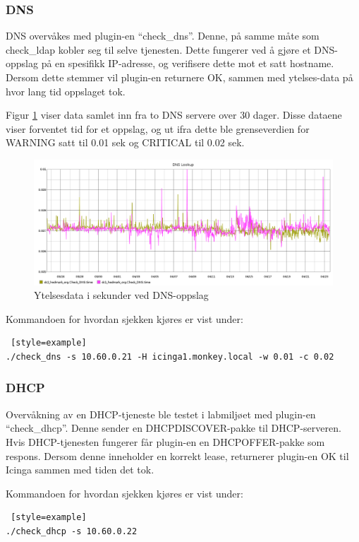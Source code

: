 \subsubsection*{DNS}
DNS overvåkes med plugin-en ``check\_dns''. Denne, på samme måte som check\_ldap kobler seg til selve tjenesten. Dette fungerer ved å gjøre et DNS-oppslag på en spesifikk IP-adresse, og verifisere dette mot et satt hostname. Dersom dette stemmer vil plugin-en returnere OK, sammen med ytelses-data på hvor lang tid oppslaget tok.

Figur \ref{dns-inv} viser data samlet inn fra to DNS servere over 30 dager. Disse dataene viser forventet tid for et oppslag, og ut ifra dette ble grenseverdien for WARNING satt til 0.01 sek og CRITICAL til 0.02 sek.

\begin{figure}[H]
    \centering
    \includegraphics[width=1.0\textwidth]{img/dns-inv}
    \caption{Ytelsesdata i sekunder ved DNS-oppslag}
    \label{dns-inv}
\end{figure}
Kommandoen for hvordan sjekken kjøres er vist under:
\begin{lstlisting} [style=example]
./check_dns -s 10.60.0.21 -H icinga1.monkey.local -w 0.01 -c 0.02
\end{lstlisting}

\clearpage
\subsubsection*{DHCP}
Overvåkning av en DHCP-tjeneste ble testet i labmiljøet med plugin-en ``check\_dhcp''. Denne sender en DHCPDISCOVER-pakke til DHCP-serveren. Hvis DHCP-tjenesten fungerer får plugin-en en DHCPOFFER-pakke som respons. Dersom denne inneholder en korrekt lease, returnerer plugin-en OK til Icinga sammen med tiden det tok.

Kommandoen for hvordan sjekken kjøres er vist under:
\begin{lstlisting} [style=example]
./check_dhcp -s 10.60.0.22
\end{lstlisting}

